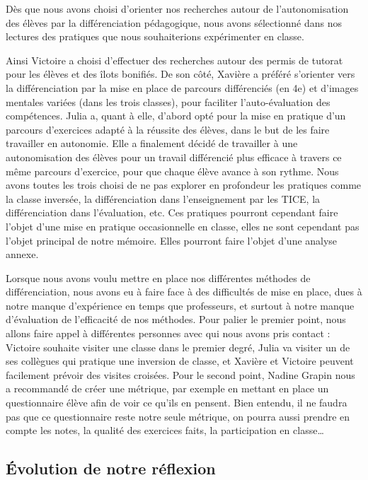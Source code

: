 Dès que nous avons choisi d’orienter nos recherches autour de l’autonomisation des élèves par la différenciation pédagogique, nous avons sélectionné dans nos lectures des pratiques que nous souhaiterions expérimenter en classe. 

Ainsi Victoire a choisi d’effectuer des recherches autour des permis de tutorat pour les élèves et des îlots bonifiés. De son côté, Xavière a préféré s’orienter vers la différenciation par la mise en place de parcours différenciés (en 4e) et d’images mentales variées (dans les trois classes), pour faciliter l’auto-évaluation des compétences. Julia a, quant à elle, d’abord opté pour la mise en pratique d’un parcours d’exercices adapté à la réussite des élèves, dans le but de les faire travailler en autonomie. Elle a finalement décidé de travailler à une autonomisation des élèves pour un travail différencié plus efficace à travers ce même parcours d’exercice, pour que chaque élève avance à son rythme. 
Nous avons toutes les trois choisi de ne pas explorer en profondeur les pratiques comme la classe inversée, la différenciation dans l’enseignement par les TICE, la différenciation dans l’évaluation, etc. Ces pratiques pourront cependant faire l’objet d’une mise en pratique occasionnelle en classe, elles ne sont cependant pas l’objet principal de notre mémoire. Elles pourront faire l’objet d’une analyse annexe.

Lorsque nous avons voulu mettre en place nos différentes méthodes de différenciation, nous avons eu à faire face à des difficultés de mise en place, dues à notre manque d’expérience en temps que professeurs, et surtout à notre manque d’évaluation de l’efficacité de nos méthodes. Pour palier le premier point, nous allons faire appel à différentes personnes avec qui nous avons pris contact : Victoire souhaite visiter une classe dans le premier degré, Julia va visiter un de ses collègues qui pratique une inversion de classe, et Xavière et Victoire peuvent facilement prévoir des visites croisées. Pour le second point, Nadine Grapin nous a recommandé de créer une métrique, par exemple en mettant en place un questionnaire élève afin de voir ce qu’ils en pensent. Bien entendu, il ne faudra pas que ce questionnaire reste notre seule métrique, on pourra aussi prendre en compte les notes, la qualité des exercices faits, la participation en classe…

\subsection{Évolution de notre réflexion}

